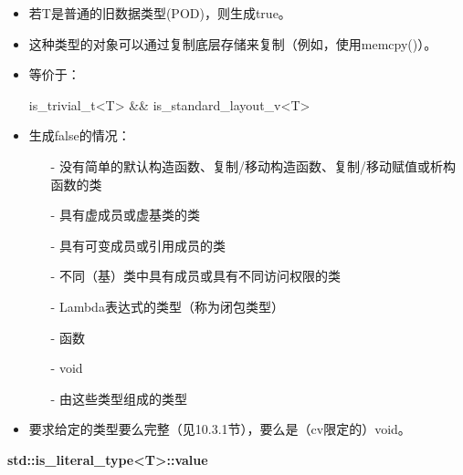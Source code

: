 \begin{itemize}
\item 
若T是普通的旧数据类型(POD)，则生成true。

\item 
这种类型的对象可以通过复制底层存储来复制（例如，使用memcpy()）。

\item
等价于： 
\begin{cpp}
is_trivial_t<T> && is_standard_layout_v<T>
\end{cpp}

\item
生成false的情况：

\begin{itemize}
\item [-]
没有简单的默认构造函数、复制/移动构造函数、复制/移动赋值或析构函数的类

\item [-]
具有虚成员或虚基类的类

\item [-]
具有可变成员或引用成员的类

\item [-]
不同（基）类中具有成员或具有不同访问权限的类

\item [-]
Lambda表达式的类型（称为闭包类型）

\item [-]
函数

\item [-]
void

\item [-]
由这些类型组成的类型
\end{itemize}

\item
要求给定的类型要么完整（见10.3.1节），要么是（cv限定的）void。
\end{itemize}

\textbf{std::is\_literal\_type<T>::value}

